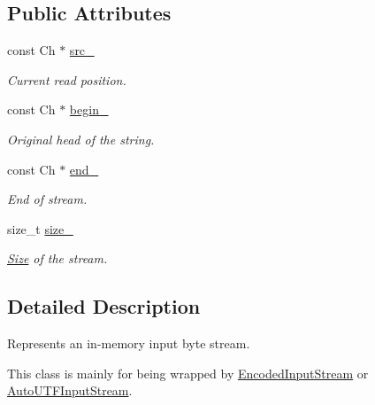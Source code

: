 \subsection*{Public Attributes}
\begin{DoxyCompactItemize}
\item 
\mbox{\label{structMemoryStream_a9954d6028da8c90de9c7c54491f97ad5}} 
const Ch $\ast$ \hyperlink{structMemoryStream_a9954d6028da8c90de9c7c54491f97ad5}{src\+\_\+}
\begin{DoxyCompactList}\small\item\em Current read position. \end{DoxyCompactList}\item 
\mbox{\label{structMemoryStream_a7a61567c1cd30c01fb319f2c37ce66ee}} 
const Ch $\ast$ \hyperlink{structMemoryStream_a7a61567c1cd30c01fb319f2c37ce66ee}{begin\+\_\+}
\begin{DoxyCompactList}\small\item\em Original head of the string. \end{DoxyCompactList}\item 
\mbox{\label{structMemoryStream_a8fae05fa0d33d148706541c3c01a984a}} 
const Ch $\ast$ \hyperlink{structMemoryStream_a8fae05fa0d33d148706541c3c01a984a}{end\+\_\+}
\begin{DoxyCompactList}\small\item\em End of stream. \end{DoxyCompactList}\item 
\mbox{\label{structMemoryStream_ab26a1b5c6d5e8f52c0f6982feba47f36}} 
size\+\_\+t \hyperlink{structMemoryStream_ab26a1b5c6d5e8f52c0f6982feba47f36}{size\+\_\+}
\begin{DoxyCompactList}\small\item\em \hyperlink{classSize}{Size} of the stream. \end{DoxyCompactList}\end{DoxyCompactItemize}


\subsection{Detailed Description}
Represents an in-\/memory input byte stream. 

This class is mainly for being wrapped by \hyperlink{classEncodedInputStream}{Encoded\+Input\+Stream} or \hyperlink{classAutoUTFInputStream}{Auto\+U\+T\+F\+Input\+Stream}.

